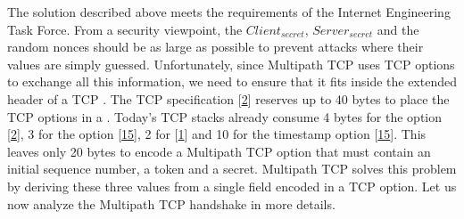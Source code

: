 \documentclass[letterpaper,10pt,english]{sphinxmanual}
\begin{document}
\sphinxAtStartPar
The solution described above meets the requirements of the Internet Engineering Task Force. From a security viewpoint, the \(Client_{secret}\), \(Server_{secret}\) and the random nonces should be as large as possible to prevent attacks where their values are simply guessed. Unfortunately, since Multipath TCP uses TCP options to exchange all this information, we need to ensure that it fits inside the extended header of a TCP . The TCP specification {[}\hyperlink{cite.biblio:id729}{2}{]} reserves up to 40 bytes to place the TCP options in a . Today’s TCP stacks already consume 4 bytes for the  option {[}\hyperlink{cite.biblio:id729}{2}{]}, 3 for the  option {[}\hyperlink{cite.biblio:id1255}{15}{]}, 2 for  {[}\hyperlink{cite.biblio:id1948}{1}{]} and 10 for the timestamp option {[}\hyperlink{cite.biblio:id1255}{15}{]}. This leaves only 20 bytes to encode a Multipath TCP option that must contain an initial sequence number, a token and a secret. Multipath TCP solves this problem by deriving these three values from a single field encoded in a TCP option. Let us now analyze the Multipath TCP handshake in more details.
\end{document}
